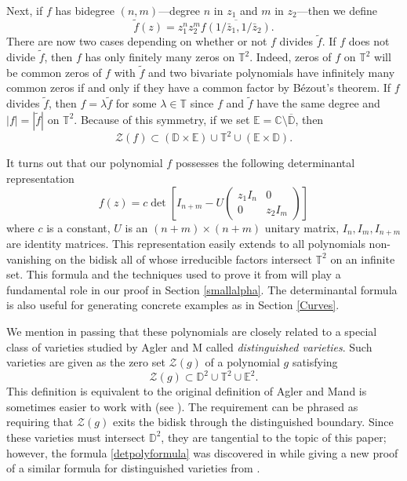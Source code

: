 \documentclass[11 pt,reqno]{amsart}
\theoremstyle{definition}
\theoremstyle{remark}
\numberwithin{equation}{section} \numberwithin{figure}{section}
\begin{document}
Next, if $f$ has bidegree $(n,m)$---degree $n$ in $z_1$ and $m$ in
$z_2$---then we define 
\[
\tilde{f}(z) = z_1^nz_2^m \overline{f(1/\bar{z}_1, 1/\bar{z}_2)}.
\]
There are now two cases depending on whether or not $f$ divides
$\tilde{f}$.  If $f$ does not divide $\tilde{f}$, then $f$ has only
finitely many zeros on ${{\mathbb T}}^2$. Indeed, zeros of $f$ on ${{\mathbb T}}^2$ will
be common zeros of $f$ with $\tilde{f}$ and two bivariate polynomials
have infinitely many common zeros if and only if they have a common
factor by B\'ezout's theorem.  If $f$ divides $\tilde{f}$, then $f =
\lambda \tilde{f}$ for some $\lambda \in {{\mathbb T}}$ since $f$ and
$\tilde{f}$ have the same degree and $|f| = |\tilde{f}|$ on ${{\mathbb T}}^2$.
Because of this symmetry, if we set ${\mathbb{E}} = {{\mathbb C}}\setminus
\overline{{\mathbb D}}$, then 
\[
\mathcal{Z}(f) \subset ({{\mathbb D}} \times {\mathbb{E}}) \cup {{\mathbb T}}^2 \cup ({\mathbb{E}}\times
{{\mathbb D}}).
\]

It turns out that our polynomial $f$ possesses the following
determinantal representation
\begin{equation} \label{detpolyformula}
f(z) = c \det\left[ I_{n+m}
  - U \begin{pmatrix}  z_1 I_n & 0 \\ 0 & z_2 I_m\end{pmatrix} \right]
\end{equation}
where $c$ is a constant, $U$ is an $(n+m)\times(n+m)$ unitary matrix,
$I_n,I_m,I_{n+m}$ are identity matrices.  This representation easily
extends to all polynomials non-vanishing on the bidisk all of whose
irreducible factors intersect ${{\mathbb T}}^2$ on an infinite set.  This
formula and the techniques used to prove it from \cite{Kne09, Kne10}
will play a fundamental role in our proof in Section
\ref{smallalpha}. The determinantal formula is also useful for
generating concrete examples as in Section \ref{Curves}.

We mention in passing that these polynomials are closely related to a
special class of varieties studied by Agler and M\McCCarthy
\cite{AM05} called {\it distinguished varieties}. Such varieties are
given as the zero set $\mathcal{Z}(g)$ of a polynomial $g$ satisfying
\[
\mathcal{Z}(g) \subset {{\mathbb D}}^2 \cup {{\mathbb T}}^2 \cup {\mathbb{E}}^2.
\]
This definition is equivalent to the original definition of Agler and
M\McCCarthy and is sometimes easier to work with (see \cite{Kne09}).
The requirement can be phrased as requiring that $\mathcal{Z}(g)$
exits the bidisk through the distinguished boundary.  Since these
varieties must intersect ${{\mathbb D}}^2$, they are tangential to the topic of
this paper; however, the formula \eqref{detpolyformula} was discovered
in \cite{Kne09} while giving a new proof of a similar formula for
distinguished varieties from \cite{AM05}.
\end{document}
